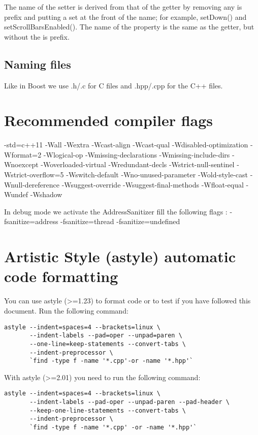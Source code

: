 \documentclass[a4paper,12pt]{article}
\begin{document}
The name of the setter is derived from that of the getter by removing any is prefix and putting a set at the front of the name; for example, setDown() and setScrollBarsEnabled(). The name of the property is the same as the getter, but without the is prefix.

\subsection{Naming files}
Like in Boost we use .h/.c for C files and .hpp/.cpp for the C++ files.

\clearpage
\newpage
\section{Recommended compiler flags}\label{sec:compiler_flags}
-std=c++11 -Wall -Wextra -Wcast-align -Wcast-qual -Wdisabled-optimization -Wformat=2 -Wlogical-op -Wmissing-declarations -Wmissing-include-dirs -Wnoexcept -Woverloaded-virtual -Wredundant-decls -Wstrict-null-sentinel -Wstrict-overflow=5 -Wswitch-default -Wno-unused-parameter -Wold-style-cast -Wnull-dereference -Wsuggest-override -Wsuggest-final-methods -Wfloat-equal -Wundef -Wshadow

In debug mode we activate the AddressSanitizer fill the following flags : -fsanitize=address -fsanitize=thread -fsanitize=undefined

\clearpage
\newpage
\section{Artistic Style (astyle) automatic code formatting}\label{sec:astyle}
You can use astyle (>=1.23) to format code or to test if you have followed this document. Run the following command:
\begin{lstlisting}[breaklines]
astyle --indent=spaces=4 --brackets=linux \
       --indent-labels --pad=oper --unpad=paren \
       --one-line=keep-statements --convert-tabs \
       --indent-preprocessor \
       `find -type f -name '*.cpp'-or -name '*.hpp'`
 \end{lstlisting}

With astyle (>=2.01) you need to run the following command:
\begin{lstlisting}[breaklines]
astyle --indent=spaces=4 --brackets=linux \
       --indent-labels --pad-oper --unpad-paren --pad-header \
       --keep-one-line-statements --convert-tabs \
       --indent-preprocessor \
       `find -type f -name '*.cpp' -or -name '*.hpp'`
 \end{lstlisting}
\end{document}
